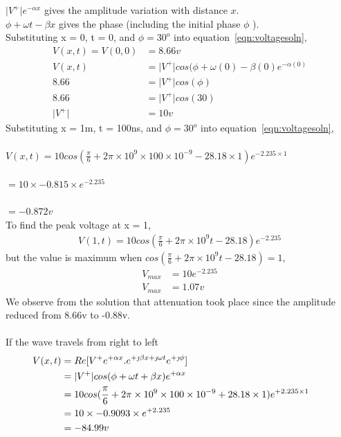\begin{exmp}
$\lvert V^+\rvert e^{-\alpha x} $ gives the amplitude variation with distance $ x $. \\
$ \phi + \omega t - \beta x $ gives the phase (including the initial phase $ \phi $ ).\\

Substituting x = 0, t = 0, and $\phi = 30^o$ into equation~\ref{eqn:voltagesoln},
\begin{align*}
V(x,t) = V(0,0) &= 8.66v \\
V(x,t) &= \lvert V^+\rvert cos(\phi + \omega (0) - \beta (0)e^{-\alpha (0)}\\
8.66 &= \lvert V^+\rvert cos(\phi)\\
8.66 &= \lvert V^+\rvert cos(30)\\
\lvert V^+\rvert &= 10v
\end{align*}
Substituting x = 1m, t = 100ns, and $\phi = 30^o$ into equation~\ref{eqn:voltagesoln},\\\\
$ V(x,t) = 10 cos(\frac{\pi}{6} + 2\pi \times 10^9\times 100\times 10^{-9} - 28.18\times 1)e^{-2.235\times 1} $\\\\
$ = 10 \times -0.815 \times e^{-2.235} $\\\\
$ = -0.872v $\\
To find the peak voltage at x = 1,
\begin{align*}
V(1,t) = 10cos(\frac{\pi}{6} + 2\pi \times 10^9t - 28.18)e^{-2.235}
\end{align*}
but the value is maximum when $cos(\frac{\pi}{6} + 2\pi \times 10^9t - 28.18) = 1$, 
\begin{align*}
V_{max} &= 10e^{-2.235}\\
V_{max} &= 1.07v
\end{align*}
We observe from the solution that attenuation took place since the amplitude reduced from 8.66v to -0.88v.\\ \\
If the wave travels from right to left
\begin{align*}
\hspace{-0.25in}V(x,t) &= Re{[V^+ e^{+\alpha x}.e^{+\jmath\beta x + \jmath\omega t}e^{+\jmath\phi}]}\\
&= \lvert V^+\rvert cos(\phi + \omega t + \beta x)e^{+\alpha x}\\
&= 10 cos(\frac{\pi}{6} + 2\pi \times 10^9\times 100\times 10^{-9} + 28.18\times 1)e^{+2.235\times 1}\\
&= 10 \times -0.9093 \times e^{+2.235}\\
&= -84.99v
\end{align*} 	
\end{exmp}

